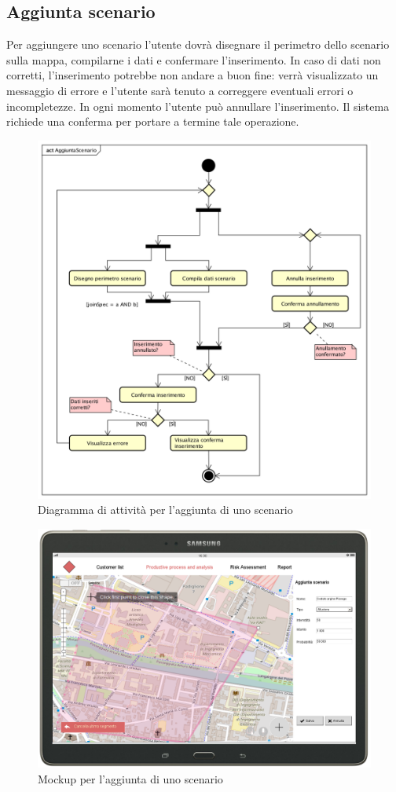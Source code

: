 \newpage
\subsection{Aggiunta scenario}
Per aggiungere uno scenario l'utente dovrà disegnare il perimetro dello scenario sulla mappa, compilarne i dati e confermare l'inserimento. In caso di dati non corretti, l'inserimento potrebbe non andare a buon fine: verrà visualizzato un messaggio di errore e l'utente sarà tenuto a correggere eventuali errori o incompletezze.
In ogni momento l'utente può annullare l'inserimento. Il sistema richiede una conferma per portare a termine tale operazione.
\begin{figure}[H]
	\centering
	\includegraphics[width=\textwidth]{img/DiagrammiDiAttivita/AggiuntaScenario.png}
	\caption{Diagramma di attività per l'aggiunta di uno scenario}
\end{figure}
\begin{figure}[H]
	\centering
	\includegraphics[width=\textwidth]{img/MockUp/m20.png}
	\caption{Mockup per l'aggiunta di uno scenario}
\end{figure}

